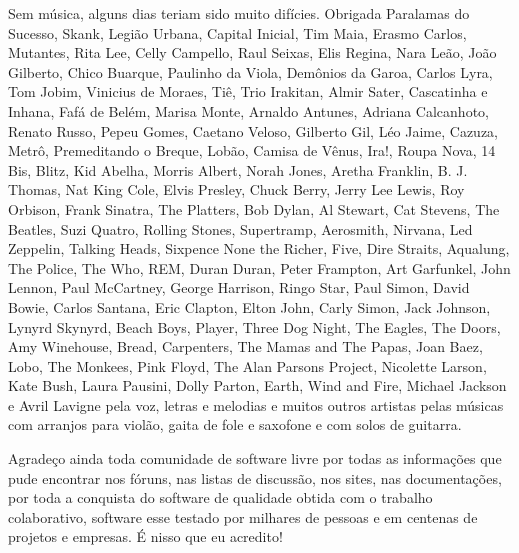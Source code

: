 Sem música, alguns dias teriam sido muito difícies. Obrigada Paralamas do Sucesso, Skank, Legião Urbana, Capital Inicial, Tim Maia, Erasmo Carlos, Mutantes, Rita Lee, Celly Campello, Raul Seixas, Elis Regina, Nara Leão, João Gilberto, Chico Buarque, Paulinho da Viola, Demônios da Garoa, Carlos Lyra, Tom Jobim, Vinicius de Moraes, Tiê, Trio Irakitan, Almir Sater, Cascatinha e Inhana, Fafá de Belém, Marisa Monte, Arnaldo Antunes,  Adriana Calcanhoto, Renato Russo, Pepeu Gomes, Caetano Veloso, Gilberto Gil, Léo Jaime, Cazuza, Metrô, Premeditando o Breque, Lobão, Camisa de Vênus, Ira!, Roupa Nova, 14 Bis, Blitz, Kid Abelha, Morris Albert, Norah Jones, Aretha Franklin, B. J. Thomas, Nat King Cole, Elvis Presley, Chuck Berry, Jerry Lee Lewis, Roy Orbison, Frank Sinatra, The Platters, Bob Dylan, Al Stewart, Cat Stevens, The Beatles, Suzi Quatro, Rolling Stones, Supertramp, Aerosmith, Nirvana, Led Zeppelin, Talking Heads, Sixpence None the Richer, Five, Dire Straits, Aqualung, The Police, The Who, REM, Duran Duran, Peter Frampton, Art Garfunkel, John Lennon, Paul McCartney, George Harrison, Ringo Star, Paul Simon, David Bowie, Carlos Santana, Eric Clapton, Elton John, Carly Simon, Jack Johnson, Lynyrd Skynyrd, Beach Boys, Player, Three Dog Night, The Eagles, The Doors, Amy Winehouse, Bread, Carpenters, The Mamas and The Papas, Joan Baez, Lobo, The Monkees, Pink Floyd, The Alan Parsons Project, Nicolette Larson, Kate Bush, Laura Pausini, Dolly Parton, Earth, Wind and Fire, Michael Jackson e Avril Lavigne pela voz, letras e melodias e muitos outros artistas pelas músicas com arranjos para violão, gaita de fole e saxofone e com solos de guitarra.

Agradeço ainda toda comunidade de software livre por todas as informações que pude encontrar nos fóruns, nas listas de discussão, nos sites, nas documentações, por toda a conquista do software de qualidade obtida com o trabalho colaborativo, software esse testado por milhares de pessoas e em centenas de projetos e empresas. É nisso que eu acredito!



